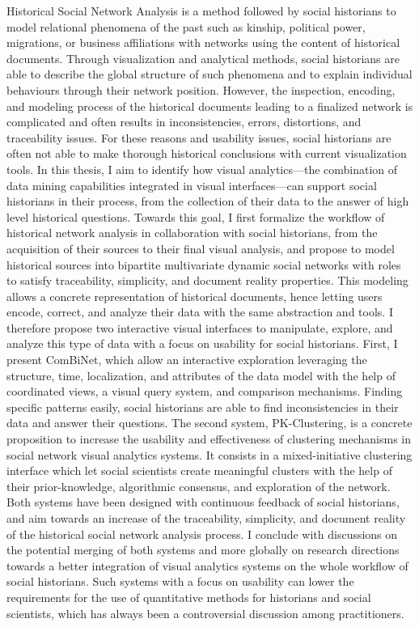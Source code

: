 \newcommand{\abstracteng}{
Historical Social Network Analysis is a method followed by social historians to model relational phenomena of the past such as kinship, political power, migrations, or business affiliations with networks using the content of historical documents.
Through visualization and analytical methods, social historians are able to describe the global structure of such phenomena and to explain individual behaviours through their network position.
However, the inspection, encoding, and modeling process of the historical documents leading to a finalized network is complicated and often results in inconsistencies, errors, distortions, and traceability issues.
For these reasons and usability issues, social historians are often not able to make thorough historical conclusions with current visualization tools. 
In this thesis, I aim to identify how visual analytics---the combination of data mining capabilities integrated in visual interfaces---can support social historians in their process, from the collection of their data to the answer of high level historical questions.
Towards this goal, I first formalize the workflow of historical network analysis in collaboration with social historians, from the acquisition of their sources to their final visual analysis, and propose to model historical sources into bipartite multivariate dynamic social networks with roles to satisfy traceability, simplicity, and document reality properties.
This modeling allows a concrete representation of historical documents, hence letting users encode, correct, and analyze their data with the same abstraction and tools.
I therefore propose two interactive visual interfaces to manipulate, explore, and analyze this type of data with a focus on usability for social historians.
First, I present ComBiNet, which allow an interactive exploration leveraging the structure, time, localization, and attributes of the data model with the help of coordinated views, a visual query system, and comparison mechanisms. 
Finding specific patterns easily, social historians are able to find inconsistencies in their data and answer their questions.
The second system, PK-Clustering, is a concrete proposition to increase the usability and effectiveness of clustering mechanisms in social network visual analytics systems. It consists in a mixed-initiative clustering interface which let social scientists create meaningful clusters with the help of their prior-knowledge, algorithmic consensus, and exploration of the network.
Both systems have been designed with continuous feedback of social historians, and aim towards an increase of the traceability, simplicity, and document reality of the historical social network analysis process.
I conclude with discussions on the potential merging of both systems and more globally on research directions towards a better integration of visual analytics systems on the whole workflow of social historians.
Such systems with a focus on usability can lower the requirements for the use of quantitative methods for historians and social scientists, which has always been a controversial discussion among practitioners.









}

\abstracteng